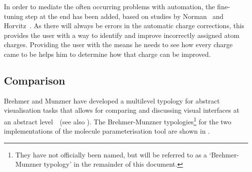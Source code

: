 In order to mediate the often occurring problems with automation, the fine-tuning step at the end has been added, based on studies by Norman~\cite{norman1990problem} and Horvitz~\cite{horvitz1999principles}. As there will always be errors in the automatic charge corrections, this provides the user with a way to identify and improve incorrectly assigned atom charges. Providing the user with the means he needs to see how every charge came to be helps him to determine how that charge can be improved.


\subsection{Comparison}
Brehmer and Munzner have developed a multilevel typology for abstract visualisation tasks that allows for comparing and discussing visual interfaces at an abstract level~\cite{brehmer2013multi}~(see also ). The Brehmer-Munzner typologies\footnote{They have not officially been named, but will be referred to as a `Brehmer-Munzner typology' in the remainder of this document.} for the two implementations of the molecule parameterisation tool are shown in .

